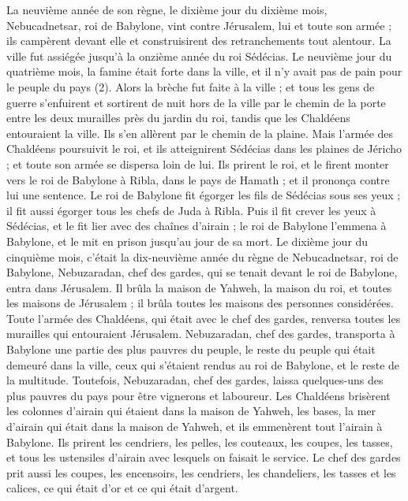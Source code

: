 \begin{multicols}{2}
La neuvième année de son règne, le dixième jour du dixième mois, Nebucadnetsar, roi de Babylone, vint contre Jérusalem, lui et toute son armée ; ils campèrent devant elle et construisirent des retranchements tout alentour.
La ville fut assiégée jusqu’à la onzième année du roi Sédécias.
Le neuvième jour du quatrième mois, la famine était forte dans la ville, et il n'y avait pas de pain pour le peuple du pays\FTNT{} (2).
Alors la brèche fut faite à la ville ; et tous les gens de guerre s'enfuirent et sortirent de nuit hors de la ville par le chemin de la porte entre les deux murailles près du jardin du roi, tandis que les Chaldéens entouraient la ville. Ils s’en allèrent par le chemin de la plaine.
Mais l'armée des Chaldéens poursuivit le roi, et ils atteignirent Sédécias dans les plaines de Jéricho ; et toute son armée se dispersa loin de lui.
Ils prirent le roi, et le firent monter vers le roi de Babylone à Ribla, dans le pays de Hamath ; et il prononça contre lui une sentence.
Le roi de Babylone fit égorger les fils de Sédécias sous ses yeux ; il fit aussi égorger tous les chefs de Juda à Ribla.
Puis il fit crever les yeux à Sédécias, et le fit lier avec des chaînes d'airain ; le roi de Babylone  l’emmena  à Babylone, et le mit en prison jusqu'au jour de sa mort.
Le dixième jour du cinquième mois, c'était la dix-neuvième année du règne de Nebucadnetsar, roi de Babylone, Nebuzaradan, chef des gardes, qui se tenait devant le roi de Babylone, entra dans Jérusalem.
Il brûla la maison de Yahweh, la maison du roi, et toutes les maisons de Jérusalem ; il brûla toutes les maisons des personnes considérées.
Toute l'armée des Chaldéens, qui était avec le chef des gardes, renversa toutes les murailles qui entouraient Jérusalem.
Nebuzaradan, chef des gardes, transporta à Babylone une partie des plus pauvres du peuple, le reste du peuple qui était demeuré dans la ville, ceux qui s’étaient rendus au roi de Babylone, et le reste de la multitude.
Toutefois, Nebuzaradan, chef des gardes, laissa quelques-uns des plus pauvres du pays pour être vignerons et laboureur.
Les Chaldéens brisèrent les colonnes d'airain qui étaient dans la maison de Yahweh, les bases, la mer d'airain qui était dans la maison de Yahweh, et ils emmenèrent tout l'airain à Babylone.
Ils prirent les cendriers, les pelles, les couteaux, les coupes, les tasses, et tous les ustensiles d'airain avec lesquels on faisait le service.
Le chef des gardes prit aussi les coupes, les encensoirs, les cendriers, les chandeliers, les tasses et les calices, ce qui était d'or et ce qui était d'argent.

\end{multicols}
